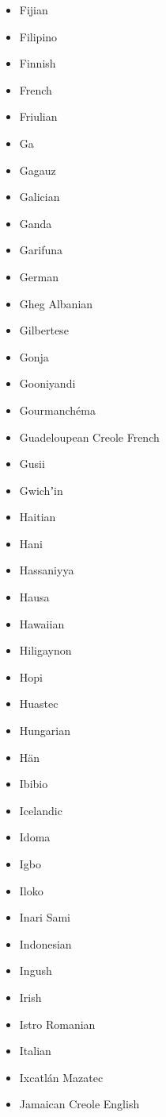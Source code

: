 \documentclass[paper=a4, 12pt]{scrbook}
\begin{document}
\begin{multicols}{3}
\begin{itemize}
        \item Fijian
        \item Filipino
        \item Finnish
        \item French
        \item Friulian
        \item Ga
        \item Gagauz
        \item Galician
        \item Ganda
        \item Garifuna
        \item German
        \item Gheg Albanian
        \item Gilbertese
        \item Gonja
        \item Gooniyandi
        \item Gourmanchéma
        \item Guadeloupean Creole French
        \item Gusii
        \item Gwichʼin
        \item Haitian
        \item Hani
        \item Hassaniyya
        \item Hausa
        \item Hawaiian
        \item Hiligaynon
        \item Hopi
        \item Huastec
        \item Hungarian
        \item Hän
        \item Ibibio
        \item Icelandic
        \item Idoma
        \item Igbo
        \item Iloko
        \item Inari Sami
        \item Indonesian
        \item Ingush
        \item Irish
        \item Istro Romanian
        \item Italian
        \item Ixcatlán Mazatec
        \item Jamaican Creole English

\end{itemize}
\end{multicols}
\end{document}

